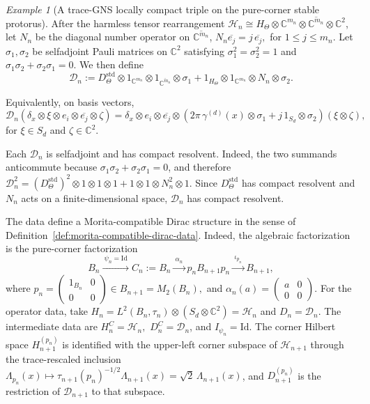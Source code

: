 \documentclass[11pt]{amsart}
\theoremstyle{definition}
\theoremstyle{remark}
\newtheorem{example}[theorem]{Example}
\newcommand{\C}{\mathbb C}
\newcommand{\id}{\mathrm{Id}}
\begin{document}
\begin{example}[A trace-GNS locally compact triple on the pure-corner stable protorus]
After the harmless tensor rearrangement
$\mathcal H_n \cong H_\Theta\otimes \C^{m_n}\otimes\overline{\C^{m_n}}\otimes\C^2$, let $N_n$ be the diagonal number operator on $\overline{\C^{m_n}}$, $N_n\overline{e_j}=j\,\overline{e_j},$ for 
$1\leq j\leq m_n$. Let $\sigma_1,\sigma_2$ be selfadjoint Pauli matrices  on $\C^2$ satisfying $\sigma_1^2=\sigma_2^2=1$ and
$\sigma_1\sigma_2+\sigma_2\sigma_1=0.$ We then define
\[
\mathcal D_n:=
D_\Theta^{\mathrm{std}}
\otimes1_{\C^{m_n}}
\otimes1_{\overline{\C^{m_n}}}
\otimes\sigma_1+1_{H_\Theta}
\otimes1_{\C^{m_n}}
\otimes N_n
\otimes\sigma_2.
\]

Equivalently, on basis vectors,
\[
\mathcal D_n
(\delta_x\otimes\xi\otimes e_i\otimes\overline{e_j}\otimes\zeta)
=
\delta_x\otimes e_i\otimes\overline{e_j}
\otimes
\left(
2\pi\,\gamma^{(d)}(x)\otimes\sigma_1
+
j\,1_{S_d}\otimes\sigma_2
\right)(\xi\otimes\zeta),
\]
for $\xi\in S_d$ and $\zeta\in\C^2$.

Each $\mathcal D_n$ is selfadjoint and has compact resolvent. Indeed, the two
summands anticommute because $\sigma_1\sigma_2+\sigma_2\sigma_1=0$, and
therefore $\mathcal D_n^2=(D_\Theta^{\mathrm{std}})^2\otimes1\otimes1\otimes1+1\otimes1\otimes N_n^2\otimes1.$
Since $D_\Theta^{\mathrm{std}}$ has compact resolvent and $N_n$ acts on a
finite-dimensional space, $\mathcal D_n$ has compact resolvent.

The data define a Morita-compatible Dirac structure in the sense of
Definition~\ref{def:morita-compatible-dirac-data}. Indeed, the algebraic
factorization is the pure-corner factorization
\[
B_n
\xrightarrow{\ \psi_n=\id\ }
C_n:=B_n
\xrightarrow{\ \alpha_n\ }
p_nB_{n+1}p_n
\xrightarrow{\ \iota_{p_n}\ }
B_{n+1},
\]
where
$p_n=
\begin{pmatrix}
1_{B_n}&0\\
0&0
\end{pmatrix}
\in B_{n+1}=M_2(B_n),$
and $\alpha_n(a)=
\begin{pmatrix}
a&0\\
0&0
\end{pmatrix}.$
For the operator data, take $H_n=L^2(B_n,\tau_n)\otimes(S_d\otimes\C^2)=\mathcal H_n$ and $D_n=\mathcal D_n$. The intermediate data are
$H_n^C=\mathcal H_n,$
$D_n^C=\mathcal D_n$, and $I_{\psi_n}=\id.$
The corner Hilbert space $H_{n+1}^{(p_n)}$ is identified with the upper-left
corner subspace of $\mathcal H_{n+1}$ through the trace-rescaled inclusion $\Lambda_{p_n}(x)\mapsto
\tau_{n+1}(p_n)^{-1/2}\Lambda_{n+1}(x)=\sqrt2\,\Lambda_{n+1}(x)$, and $D_{n+1}^{(p_n)}$ is the
restriction of $\mathcal D_{n+1}$ to that subspace. 


\end{example}
\end{document}
